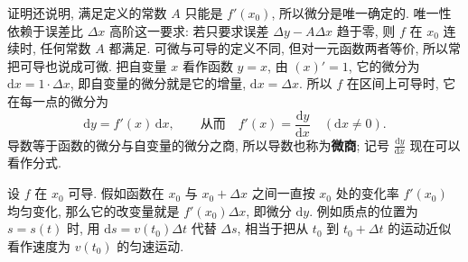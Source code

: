 \documentclass[UTF8,openany]{ctexbook}
\theoremstyle{chinesetextbook}
\newcommand{\dd}{\mathrm d}
\begin{document}
证明还说明, 满足定义的常数 $A$ 只能是 $f'(x_0)$, 所以微分是唯一确定的. 唯一性依赖于误差比 $\Delta x$ 高阶这一要求: 若只要求误差 $\Delta y-A\Delta x$ 趋于零, 则 $f$ 在 $x_0$ 连续时, 任何常数 $A$ 都满足. 可微与可导的定义不同, 但对一元函数两者等价, 所以常把可导也说成可微. 把自变量 $x$ 看作函数 $y=x$, 由 $(x)'=1$, 它的微分为 $\dd x=1\cdot\Delta x$, 即自变量的微分就是它的增量, $\dd x=\Delta x$. 所以 $f$ 在区间上可导时, 它在每一点的微分为
\[
\dd y=f'(x)\,\dd x,\qquad\text{从而}\quad f'(x)=\frac{\dd y}{\dd x}\quad(\dd x\ne0).
\]
导数等于函数的微分与自变量的微分之商, 所以导数也称为\textbf{微商}; 记号 $\displaystyle\frac{\dd y}{\dd x}$ 现在可以看作分式.

设 $f$ 在 $x_0$ 可导. 假如函数在 $x_0$ 与 $x_0+\Delta x$ 之间一直按 $x_0$ 处的变化率 $f'(x_0)$ 均匀变化, 那么它的改变量就是 $f'(x_0)\Delta x$, 即微分 $\dd y$. 例如质点的位置为 $s=s(t)$ 时, 用 $\dd s=v(t_0)\Delta t$ 代替 $\Delta s$, 相当于把从 $t_0$ 到 $t_0+\Delta t$ 的运动近似看作速度为 $v(t_0)$ 的匀速运动.
\end{document}

